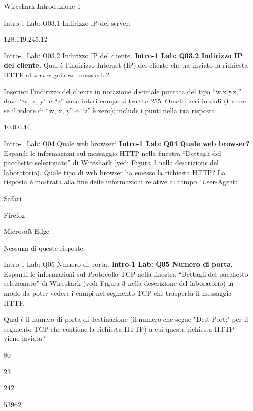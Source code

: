 \documentclass[a4paper]{article}
\begin{document}
\begin{quiz}{Wireshark-Introduzione-1}
\begin{shortanswer}[points=1]{Intro-1 Lab: Q03.1 Indirizzo IP del server.}
\item 128.119.245.12
\end{shortanswer}

\begin{shortanswer}[points=1]{Intro-1 Lab: Q03.2 Indirizzo IP del cliente.}
\textbf{Intro-1 Lab: Q03.2 Indirizzo IP del cliente.}
Qual è l'indirizzo Internet (IP) del cliente che ha inviato la richiesta HTTP al server gaia.cs.umass.edu?

Inserisci l'indirizzo del cliente in notazione decimale puntata del tipo ``w.x.y.z,'' dove ``w, x, y'' e ``z'' sono interi compresi tra 0 e 255. Ometti zeri iniziali (tranne se il valore di ``w, x, y'' o ``z'' è zero); include i punti nella tua risposta:

\item 10.0.0.44
\end{shortanswer}

\begin{multi}[points=1]{Intro-1 Lab: Q04 Quale web browser?}
\textbf{Intro-1 Lab: Q04 Quale web browser?}
Espandi le informazioni sul messaggio HTTP nella finestra ``Dettagli del pacchetto selezionato'' di Wireshark (vedi Figura 3 nella descrizione del laboratorio). Quale tipo di web browser ha emesso la richiesta HTTP? La risposta è mostrata alla fine delle informazioni relative al campo "User-Agent:".

\item Safari
\item* Firefox
\item Microsoft Edge
\item Nessuna di queste risposte.
\end{multi}

\begin{multi}[points=1]{Intro-1 Lab: Q05 Numero di porta.}
\textbf{Intro-1 Lab: Q05 Numero di porta.}
Espandi le informazioni sul Protocollo TCP nella finestra ``Dettagli del pacchetto selezionato'' di Wireshark (vedi Figura 3 nella descrizione del laboratorio) in modo da poter vedere i campi nel segmento TCP che trasporta il messaggio HTTP.

Qual è il numero di porta di destinazione (il numero che segue "Dest Port:" per il segmento TCP che contiene la richiesta HTTP) a cui questa richiesta HTTP viene inviata?

\item* 80
\item 23
\item 242
\item 53962
\end{multi}

\end{quiz}
\end{document}
